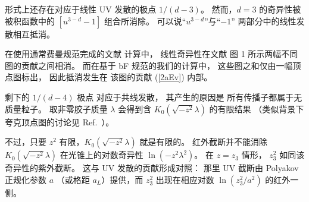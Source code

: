 形式上还存在对应于线性 UV 发散的极点 $1/(d-3)$。
然而，$d=3$ 的奇异性被被积函数中的 $\left [u^{3-d}-1\right ]$ 组合所消除。
可以说``$u^{3-d}$''与``$-1$''
两部分中的线性发散相互抵消。

在使用通常费曼规范完成的文献 \cite{Zhang:2018diq,Wang:2019tgg} 计算中，
线性奇异性在文献 \cite{Wang:2019tgg} 图 1 所示两幅不同图的贡献之间相消。
而在基于 bF 规范的我们的计算中，
这些图之和仅由一幅顶点图标出，
因此抵消发生在
该图的贡献 (\ref{2aEv}) 内部。

剩下的 $1/(d-4)$ 极点
对应于共线发散，
其产生的原因是
所有传播子都属于无质量粒子。
取非零胶子质量 $\lambda$ 会得到含 $K_0(\sqrt{-z^2} \lambda)$ 的有限结果
（类似背景下夸克顶点图的讨论见
Ref.~\cite{Radyushkin:2017lvu}）。

不过，只要 $z^2$ 有限，$K_0(\sqrt{-z^2} \lambda)$ 就是有限的。
红外截断并不能消除
$K_0(\sqrt{-z^2} \lambda)$ 在光锥上的对数奇异性 $\ln (-z^2 \lambda^2)$。
在 $z=z_3$ 情形，
$z_3^2$ 如同该奇异性的紫外截断。
这与 UV 发散的贡献形成对照：
那里 UV 截断由 Polyakov 正规化参数 $a$
（或格距 $a_L$）提供，而 $z_3^2$ 出现在相应对数 $\ln (z_3^2/a^2)$ 的红外一侧。
